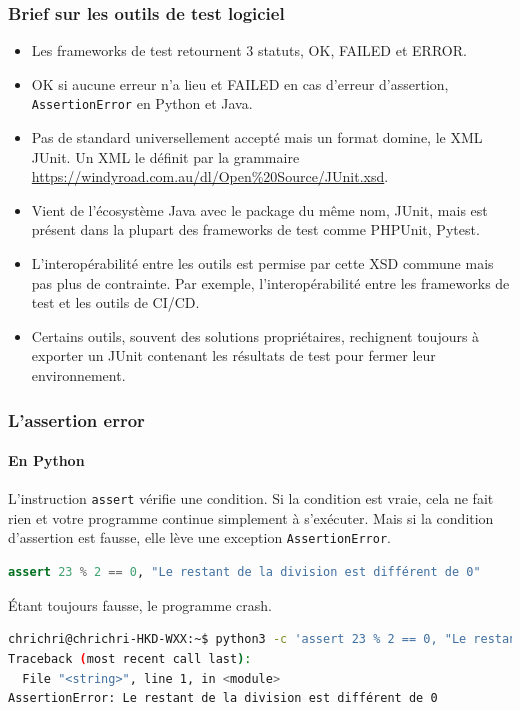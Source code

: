 \documentclass{beamer}
\begin{document}
    \begin{frame}
        \transdissolve
        \frametitle{Brief sur les outils de test logiciel}
        \begin{itemize}
            \item Les frameworks de test retournent 3 statuts, OK, FAILED et ERROR.

            \item OK si aucune erreur n’a lieu et FAILED en cas d’erreur d’assertion, \lstinline{AssertionError} en Python et Java.

            \item Pas de standard universellement accepté mais un format domine, le XML JUnit. Un XML le définit par la grammaire \url{https://windyroad.com.au/dl/Open\%20Source/JUnit.xsd}.

            \item Vient de l’écosystème Java avec le package du même nom, JUnit, mais est présent dans la plupart des frameworks de test comme PHPUnit, Pytest.

            \item L’interopérabilité entre les outils est permise par cette XSD commune mais pas plus de contrainte. Par exemple, l’interopérabilité entre les frameworks de test et les outils de CI/CD.

            \item Certains outils, souvent des solutions propriétaires, rechignent toujours à exporter un JUnit contenant les résultats de test pour fermer leur environnement.

        \end{itemize}
    \end{frame}


    \begin{frame}[fragile]
        \frametitle{L'assertion error}
        \framesubtitle{En Python}
        \transdissolve
        L’instruction \lstinline{assert} vérifie une condition.
        Si la condition est vraie, cela ne fait rien et votre programme continue simplement à s’exécuter. Mais si la condition d’assertion est fausse, elle lève une exception \lstinline{AssertionError}.
        \begin{lstlisting}[language=Python]
assert 23 % 2 == 0, "Le restant de la division est différent de 0"
        \end{lstlisting}
        Étant toujours fausse, le programme crash.
        \begin{lstlisting}[language=sh]
chrichri@chrichri-HKD-WXX:~$ python3 -c 'assert 23 % 2 == 0, "Le restant de la division est différent de 0"'
Traceback (most recent call last):
  File "<string>", line 1, in <module>
AssertionError: Le restant de la division est différent de 0
        \end{lstlisting}
    \end{frame}
\end{document}
